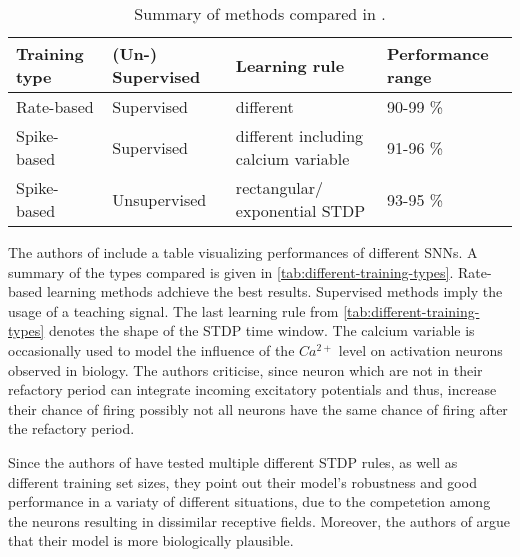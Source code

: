 \begin{table}[]
    \begin{tabular}{|l|l|l|l|}
    \hline
    \textbf{Training type} & \textbf{(Un-) Supervised}    & \textbf{Learning rule}               & \textbf{Performance range} \\ \hline
    Rate-based             & Supervised                   & different                            & 90-99 \%                   \\ \hline
    Spike-based            & Supervised                   & different including calcium variable & 91-96 \%                   \\ \hline
    Spike-based            & Unsupervised                 & rectangular/ exponential \ac{STDP}        & 93-95 \%                   \\ \hline
    \end{tabular}
    \caption{Summary of methods compared in \cite{SNN}.}
    \label{tab:different-training-types}
\end{table}

The authors of \cite{SNN} include a table visualizing performances of different \acp{SNN}.
A summary of the types compared is given in \autoref{tab:different-training-types}.
Rate-based learning methods adchieve the best results.
Supervised methods imply the usage of a teaching signal.
The last learning rule from \autoref{tab:different-training-types} denotes the shape of the \ac{STDP} time window.
The calcium variable \cite{STDP_hebbian} is occasionally used to model the influence of the $Ca^{2+}$ level on activation neurons observed in biology.
The authors criticise, since neuron which are not in their refactory period can integrate incoming excitatory potentials and thus, 
increase their chance of firing possibly not all neurons have the same chance of firing after the refactory period.

Since the authors of \cite{SNN} have tested multiple different \ac{STDP} rules, as well as different training set sizes, 
they point out their model's robustness and good performance in a variaty of different situations, 
due to the competetion among the neurons resulting in dissimilar receptive fields.
Moreover, the authors of \cite{SNN} argue that their model is more biologically plausible.